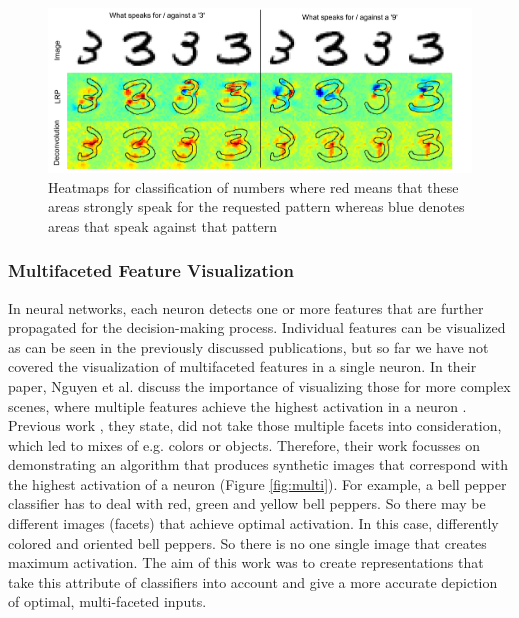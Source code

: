 \documentclass{acmsiggraph}               %
\begin{document}
\begin{figure}
\center
\includegraphics[width=\textwidth]{heatmap_samek_et_al}
\caption{Heatmaps for classification of numbers where red means that these areas strongly speak for the requested pattern whereas blue denotes areas that speak against that pattern \protect\cite{Samek2017}}
\label{fig:heatmap_numbers}
\end{figure}

\subsubsection{Multifaceted Feature Visualization}
In neural networks, each neuron detects one or more features that are further propagated for the decision-making process. 
Individual features can be visualized as can be seen in the previously discussed publications, but so far we have not covered the visualization of multifaceted features in a single neuron. 
In their paper, Nguyen et al. discuss the importance of visualizing those for more complex scenes, where multiple features achieve the highest activation in a neuron \cite{Nguyen2016}. 
Previous work \cite{Erhan2009}, they state, did not take those multiple facets into consideration, which led to mixes of e.g. colors or objects. 
Therefore, their work focusses on demonstrating an algorithm that produces synthetic images that correspond with the highest activation of a neuron (Figure \ref{fig:multi}). 
For example, a bell pepper classifier has to deal with red, green and yellow bell peppers. 
So there may be different images (facets) that achieve optimal activation. 
In this case, differently colored and oriented bell peppers. 
So there is no one single image that creates maximum activation. 
The aim of this work was to create representations that take this attribute of classifiers into account and give a more accurate depiction of optimal, multi-faceted inputs.
\end{document}
